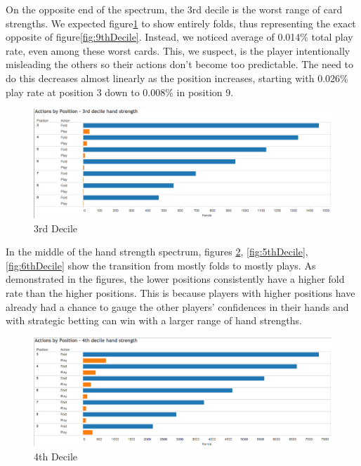 \documentclass[twoside]{article}
\begin{document}
\begin{multicols}{2}
On the opposite end of the spectrum, the 3rd decile is the worst range of card strengths. We expected figure\ref{fig:3rdDecile} to show entirely folds, thus representing the exact opposite of figure\ref{fig:9thDecile}. Instead, we noticed average of 0.014\% total play rate, even among these worst cards. This, we suspect, is the player intentionally misleading the others so their actions don't become too predictable. The need to do this decreases almost linearly as the position increases, starting with 0.026\% play rate at position 3 down to 0.008\% in position 9. 

\begin{figure}[H]
  \centering
  \centerline{\includegraphics[width=1.1\columnwidth]{3rdDecile.png}}
   \caption{3rd Decile}
  \label{fig:3rdDecile}
\end{figure}

In the middle of the hand strength spectrum, figures \ref{fig:4thDecile}, \ref{fig:5thDecile}, \ref{fig:6thDecile} show the transition from mostly folds to mostly plays. As demonstrated in the figures, the lower positions consistently have a higher fold rate than the higher positions. This is because players with higher positions have already had a chance to gauge the other players' confidences in their hands and with strategic betting can win with a larger range of hand strengths. 

\begin{figure}[H]
  \centering
  \centerline{\includegraphics[width=1.1\columnwidth]{4thDecile.png}}
   \caption{4th Decile}
  \label{fig:4thDecile}
\end{figure}


\end{multicols}
\end{document}
